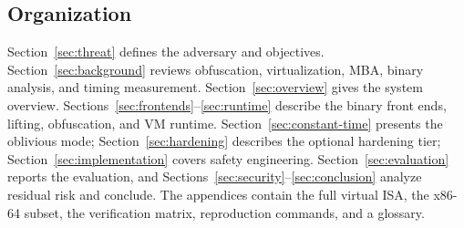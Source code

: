 \subsection{Organization}

Section~\ref{sec:threat} defines the adversary and objectives.
Section~\ref{sec:background} reviews obfuscation, virtualization, MBA, binary
analysis, and timing measurement. Section~\ref{sec:overview} gives the system
overview. Sections~\ref{sec:frontends}--\ref{sec:runtime} describe the binary
front ends, lifting, obfuscation, and VM runtime.
Section~\ref{sec:constant-time} presents the oblivious mode;
Section~\ref{sec:hardening} describes the optional hardening tier;
Section~\ref{sec:implementation} covers safety engineering.
Section~\ref{sec:evaluation} reports the evaluation, and
Sections~\ref{sec:security}--\ref{sec:conclusion} analyze residual risk and
conclude. The appendices contain the full virtual ISA, the x86-64 subset, the
verification matrix, reproduction commands, and a glossary.
